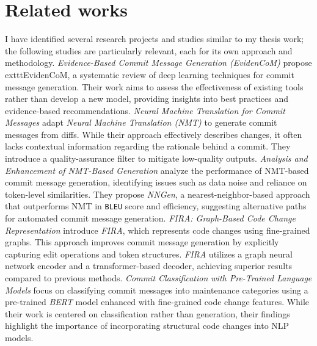 \chapter{Related works}
I have identified several research projects and studies similar to my thesis work; the following studies are particularly relevant, each for its own approach and methodology.
\textit{Evidence-Based Commit Message Generation (EvidenCoM)}
\citet{vegas_evidence-based_2024} propose 	exttt{EvidenCoM}, a systematic review of deep learning techniques for commit message generation. Their work aims to assess the effectiveness of existing tools rather than develop a new model, providing insights into best practices and evidence-based recommendations.
\textit{Neural Machine Translation for Commit Messages}
\citet{jiang_automatically_2017} adapt \textit{Neural Machine Translation (NMT)} to generate commit messages from diffs. While their approach effectively describes changes, it often lacks contextual information regarding the rationale behind a commit. They introduce a quality-assurance filter to mitigate low-quality outputs.
\textit{Analysis and Enhancement of NMT-Based Generation}
\citet{liu_neural-machine-translation-based_2018} analyze the performance of NMT-based commit message generation, identifying issues such as data noise and reliance on token-level similarities. They propose \textit{NNGen}, a nearest-neighbor-based approach that outperforms NMT in 	\texttt{BLEU} score and efficiency, suggesting alternative paths for automated commit message generation.
\textit{FIRA: Graph-Based Code Change Representation}
\citet{dong_fira_2022} introduce 	\textit{FIRA}, which represents code changes using fine-grained graphs. This approach improves commit message generation by explicitly capturing edit operations and token structures. 	\textit{FIRA} utilizes a graph neural network encoder and a transformer-based decoder, achieving superior results compared to previous methods.
\textit{Commit Classification with Pre-Trained Language Models}
\citet{ghadhab_augmenting_2021} focus on classifying commit messages into maintenance categories using a pre-trained \textit{BERT} model enhanced with fine-grained code change features. While their work is centered on classification rather than generation, their findings highlight the importance of incorporating structural code changes into NLP models.

